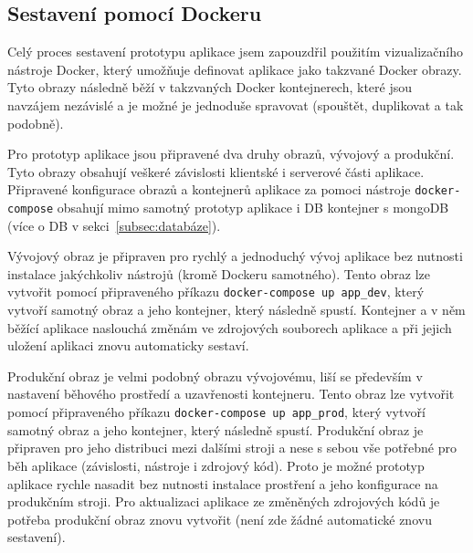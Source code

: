 \subsection{Sestavení pomocí Dockeru}\label{subsec:sestaveníPomocíDockeru}

Celý proces sestavení prototypu aplikace jsem zapouzdřil použitím vizualizačního nástroje Docker, který umožňuje definovat aplikace jako takzvané Docker obrazy.
Tyto obrazy následně běží v takzvaných Docker kontejnerech, které jsou navzájem nezávislé a je možné je jednoduše spravovat (spouštět, duplikovat a tak podobně).

Pro prototyp aplikace jsou připravené dva druhy obrazů, vývojový a produkční.
Tyto obrazy obsahují veškeré závislosti klientské i serverové části aplikace.
Připravené konfigurace obrazů a kontejnerů aplikace za pomoci nástroje \texttt{docker-compose} obsahují mimo samotný prototyp aplikace i DB kontejner s mongoDB (více o DB v sekci~\ref{subsec:databáze}).

Vývojový obraz je připraven pro rychlý a jednoduchý vývoj aplikace bez nutnosti instalace jakýchkoliv nástrojů (kromě Dockeru samotného).
Tento obraz lze vytvořit pomocí připraveného příkazu \texttt{docker-compose up app_dev}, který vytvoří samotný obraz a jeho kontejner, který následně spustí.
Kontejner a v něm běžící aplikace naslouchá změnám ve zdrojových souborech aplikace a při jejich uložení aplikaci znovu automaticky sestaví.

Produkční obraz je velmi podobný obrazu vývojovému, liší se především v nastavení běhového prostředí a uzavřenosti kontejneru.
Tento obraz lze vytvořit pomocí připraveného příkazu \texttt{docker-compose up app_prod}, který vytvoří samotný obraz a jeho kontejner, který následně spustí.
Produkční obraz je připraven pro jeho distribuci mezi dalšími stroji a nese s sebou vše potřebné pro běh aplikace (závislosti, nástroje i zdrojový kód).
Proto je možné prototyp aplikace rychle nasadit bez nutnosti instalace prostření a jeho konfigurace na produkčním stroji.
Pro aktualizaci aplikace ze změněných zdrojových kódů je potřeba produkční obraz znovu vytvořit (není zde žádné automatické znovu sestavení).
